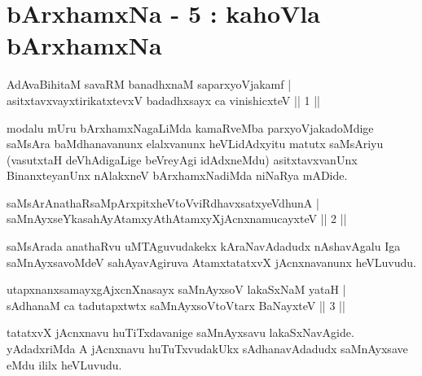 


\chapter{bArxhamxNa - 5 : kahoVla bArxhamxNa}

\begin{shl}
AdAvaBihitaM savaRM banadhxnaM saparxyoVjakamf |\\
asitxtavxvayxtirikatxtevxV badadhxsayx ca vinishicxteV \hfill || 1 ||
\end{shl}

\begin{artha}%
modalu mUru bArxhamxNagaLiMda kamaRveMba parxyoVjakadoMdige saMsAra baMdhanavanunx elalxvanunx heVLidAdxyitu matutx saMsAriyu (vasutxtaH deVhAdigaLige beVreyAgi idAdxneMdu) asitxtavxvanUnx BinanxteyanUnx nAlakxneV bArxhamxNadiMda niNaRya mADide.
\end{artha}


\begin{shl}
saMsArAnathaRsaMpArxpitxheVtoVviRdhavxsatxyeV\s dhunA |\\
saMnAyxseYkasahAyAtamxyAthAtamxyXjAcnxnamucayxteV \hfill || 2 ||
\end{shl}

\begin{artha}
saMsArada anathaRvu uMTAguvudakekx kAraNavAdadudx nAshavAgalu Iga saMnAyxsavoMdeV sahAyavAgiruva AtamxtatatxvX jAcnxnavanunx heVLuvudu.
\end{artha}


\begin{shl}
utapxnanxsamayxgAjxcnXnasayx saMnAyxsoV lakaSxNaM yataH |\\
sAdhanaM ca tadutapxtwtx saMnAyxsoV\s toV\s tarx BaNayxteV \hfill || 3 ||
\end{shl}

\begin{artha}
tatatxvX jAcnxnavu huTiTxdavanige saMnAyxsavu lakaSxNavAgide. yAdadxriMda A jAcnxnavu huTuTxvudakUkx sAdhanavAdadudx saMnAyxsave eMdu ililx heVLuvudu.
\end{artha}

